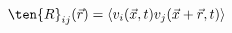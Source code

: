 \begin{equation}\label{eq:hit_two_point_velocity_correlation_tensor}
  \ten{R}_{ij}(\vec{r}) = \langle
    v_i(\vec{x}, t) v_j(\vec{x} + \vec{r}, t)
  \rangle
\end{equation}
